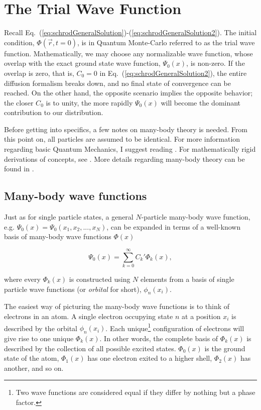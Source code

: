 \section{The Trial Wave Function}

Recall Eq.~(\ref{eq:schrodGeneralSolution})-(\ref{eq:schrodGeneralSolution2}). The initial condition, $\Phi(\vec r, t=0)$,
is in Quantum Monte-Carlo referred to as the trial wave function. Mathematically, we may choose any normalizable wave function, whose overlap with the exact ground state wave function, $\Psi_0(x)$, is non-zero. If the overlap is zero, that is, $C_0=0$ in Eq.~(\ref{eq:schrodGeneralSolution2}), the entire diffusion formalism breaks down, and no final state of convergence can be reached. On the other hand, the opposite scenario implies the opposite behavior; the closer $C_0$ is to unity, the more rapidly $\Psi_0(x)$ will become the dominant contribution to our distribution. 

Before getting into specifics, a few notes on many-body theory is needed. From this point on, all particles are assumed to be identical. For more information regarding basic Quantum Mechanics, I suggest reading \cite{griffiths}. For mathematically rigid derivations of concepts, see \cite{Sakurai:94}. More details regarding many-body theory can be found in \cite{Shavitt}. 

\subsection{Many-body wave functions}

Just as for single particle states, a general $N$-particle many-body wave function, e.g. $\Psi_0(x)=\Psi_0(x_1, x_2, ..., x_N)$, can be expanded in terms of a well-known basis of many-body wave functions $\Phi(x)$

\begin{equation}
\label{eq:manyBodyExp}
 \Psi_0(x) = \sum_{k=0}^\infty C_k'\Phi_k(x),
\end{equation}

where every $\Phi_k(x)$ is constructed using $N$ elements from a basis of single particle wave functions (or \textit{orbital} for short), $\phi_n(x_i)$. 

The easiest way of picturing the many-body wave functions is to think of electrons in an atom. A single electron occupying state $n$ at a position $x_i$ is described by the orbital $\phi_n(x_i)$. Each unique\footnote{Two wave functions are considered equal if they differ by nothing but a phase factor.} configuration of electrons will give rise to one unique $\Phi_k(x)$. In other words, the complete basis of $\Phi_k(x)$ is described by the collection of all possible excited states. $\Phi_0(x)$ is the ground state of the atom, $\Phi_1(x)$ has one electron exited to a higher shell, $\Phi_2(x)$ has another, and so on.

